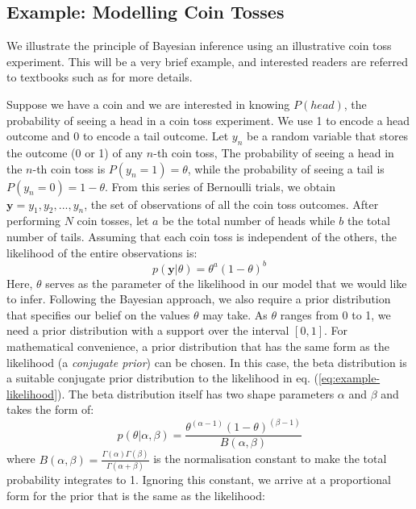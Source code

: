 \subsection{Example: Modelling Coin Tosses}
\label{sub:background-coin-toss}

We illustrate the principle of Bayesian inference using an illustrative coin toss experiment. This will be a very brief example, and interested readers are referred to textbooks such as \cite{rogers2015first, gelman2014bayesian, murphy2012machine} for more details. 

Suppose we have a coin and we are interested in knowing $P(head)$, the probability of seeing a head in a coin toss experiment. We use 1 to encode a head outcome and 0 to encode a tail outcome. Let $y_n$ be a random variable that stores the outcome (0 or 1) of any $n$-th coin toss, The probability of seeing a head in the $n$-th coin toss is $P(y_n=1)=\theta$, while the probability of seeing a tail is $P(y_n=0)=1-\theta$. From this series of Bernoulli trials, we obtain $\mathbf{y}=y_1,y_2,...,y_n$, the set of observations of all the coin toss outcomes. After performing $N$ coin tosses, let $a$ be the total number of heads while $b$ the total number of tails. Assuming that each coin toss is independent of the others, the likelihood of the entire observations is: 
\begin{equation}
p(\mathbf{y} \vert \theta)=\theta^a(1-\theta)^b
\label{eq:example-likelihood}
\end{equation}
Here, $\theta$ serves as the parameter of the likelihood in our model that we would like to infer. Following the Bayesian approach, we also require a prior distribution that specifies our belief on the values $\theta$ may take. As $\theta$ ranges from 0 to 1, we need a prior distribution with a support over the interval $[0, 1]$. For mathematical convenience, a prior distribution that has the same form as the likelihood (a \emph{conjugate prior}) can be chosen. In this case, the beta distribution is a suitable conjugate prior distribution to the likelihood in eq. (\ref{eq:example-likelihood}). The beta distribution itself has two shape parameters $\alpha$ and $\beta$ and takes the form of:
\begin{equation}
p(\theta \vert \alpha,\beta)=\frac{\theta^{(\alpha-1)}(1-\theta)^{(\beta-1)}}{B(\alpha,\beta)}
\end{equation}
where $B(\alpha,\beta)=\frac{\Gamma(\alpha)\Gamma(\beta)}{\Gamma(\alpha+\beta)}$ is the normalisation constant to make the total probability integrates to 1. Ignoring this constant, we arrive at a proportional form for the prior that is the same as the likelihood:
